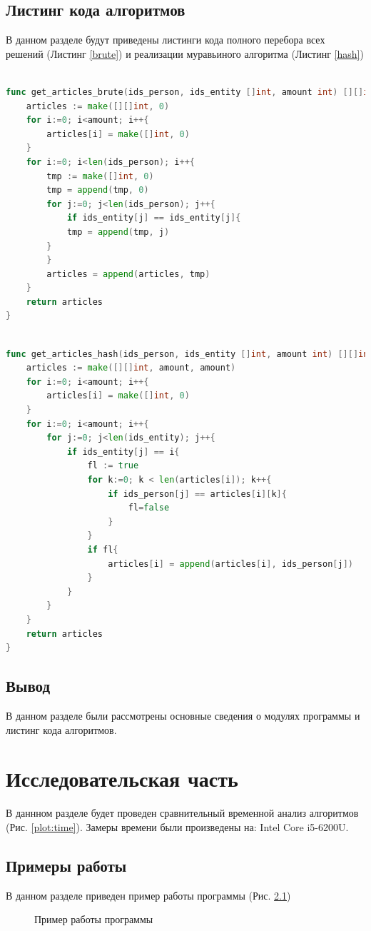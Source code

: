\documentclass[12pt]{report}
\begin{document}
\section{Листинг кода алгоритмов}
В данном разделе будут приведены листинги кода полного перебора всех решений (Листинг \ref{brute}) и реализации муравьиного алгоритма (Листинг \ref{hash})
\begin{lstlisting}[label=brute,caption = Перебор всех возможных вариантов, language = go]

func get_articles_brute(ids_person, ids_entity []int, amount int) [][]int{
	articles := make([][]int, 0)
	for i:=0; i<amount; i++{
		articles[i] = make([]int, 0)
	}
	for i:=0; i<len(ids_person); i++{
		tmp := make([]int, 0)
		tmp = append(tmp, 0)
		for j:=0; j<len(ids_person); j++{
			if ids_entity[j] == ids_entity[j]{
			tmp = append(tmp, j)
		}		
		}
		articles = append(articles, tmp)
	}
	return articles
}
\end{lstlisting}

\begin{lstlisting}[label=hash,caption = Муравьиный алгоритм, language = go]

func get_articles_hash(ids_person, ids_entity []int, amount int) [][]int{
	articles := make([][]int, amount, amount)
	for i:=0; i<amount; i++{
		articles[i] = make([]int, 0)
	}
	for i:=0; i<amount; i++{
		for j:=0; j<len(ids_entity); j++{
			if ids_entity[j] == i{
				fl := true
				for k:=0; k < len(articles[i]); k++{
					if ids_person[j] == articles[i][k]{
						fl=false
					}
				}
				if fl{
					articles[i] = append(articles[i], ids_person[j])
				}
			}		
		}
	}
	return articles
} 
\end{lstlisting}
\section*{Вывод}
В данном разделе были рассмотрены основные сведения о модулях программы и листинг кода алгоритмов.

\chapter{Исследовательская часть}
В даннном разделе будет проведен сравнительный временной анализ алгоритмов (Рис. \ref{plot:time}). Замеры времени были произведены на: Intel Core i5-6200U.
\section{Примеры работы}
В данном разделе приведен пример работы программы (Рис. \ref{ris:example})
\begin{figure}[h]
	\caption{Пример работы программы}
	\label{ris:example}
\end{figure}
\end{document}
